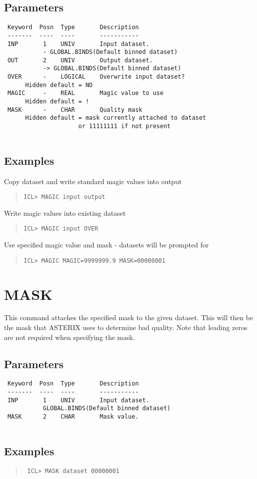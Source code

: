 \documentclass{book}
\renewcommand{\_}{{\tt\char'137}}     %
\begin{document}
\subsection{Parameters}
\begin{verbatim}
 Keyword  Posn  Type       Description
 -------  ----  ----       -----------
 INP       1    UNIV       Input dataset.
           - GLOBAL.BINDS(Default binned dataset)
 OUT       2    UNIV       Output dataset.
           -> GLOBAL.BINDS(Default binned dataset)
 OVER      -    LOGICAL    Overwrite input dataset?
      Hidden default = NO
 MAGIC     -    REAL       Magic value to use
      Hidden default = !
 MASK      -    CHAR       Quality mask
      Hidden default = mask currently attached to dataset
                     or 11111111 if not present
 
\end{verbatim}\subsection{Examples}
Copy dataset and write standard magic values into output
\begin{quote}\begin{verbatim}
ICL> MAGIC input output
\end{verbatim}\end{quote}
Write magic values into existing dataset
\begin{quote}\begin{verbatim}
ICL> MAGIC input OVER
\end{verbatim}\end{quote}
Use specified magic value and mask - datasets will be prompted for
\begin{quote}\begin{verbatim}
ICL> MAGIC MAGIC=9999999.9 MASK=00000001
\end{verbatim}\end{quote}
\section{MASK}
This command attaches the specified mask to the given dataset. This
will then be the mask that ASTERIX uses to determine bad quality.
Note that leading zeros are not required when specifying the mask.
 
\subsection{Parameters}
\begin{verbatim}
 Keyword  Posn  Type       Description
 -------  ----  ----       -----------
 INP       1    UNIV       Input dataset.
           GLOBAL.BINDS(Default binned dataset)
 MASK      2    CHAR       Mask value.
 
\end{verbatim}\subsection{Examples}
\begin{quote}\begin{verbatim}
 ICL> MASK dataset 00000001
\end{verbatim}\end{quote}
\end{document}
